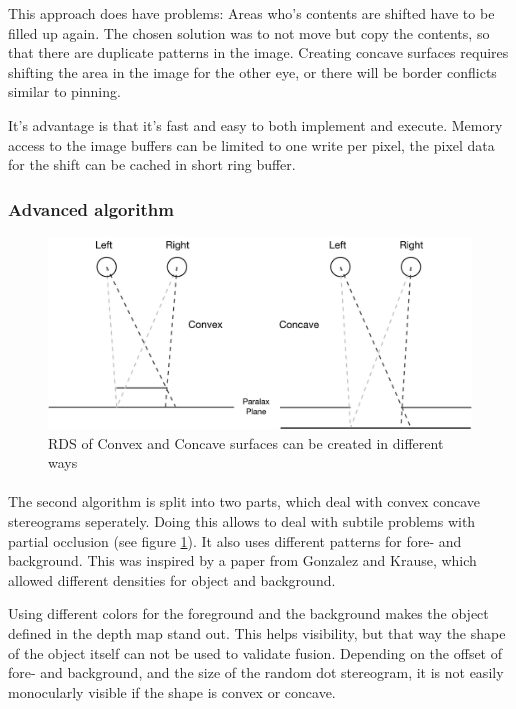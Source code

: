 This approach does have problems: Areas who's contents are shifted have to be filled up again. The chosen solution was to not move but copy the contents, so that there are duplicate patterns in the image. Creating concave surfaces requires shifting the area in the image for the other eye, or there will be border conflicts similar to pinning.

It's advantage is that it's fast and easy to both implement and execute. Memory access to the image buffers can be limited to one write per pixel, the pixel data for the shift can be cached in short ring buffer.

\subsubsection{Advanced algorithm}
\begin{figure}[htb]
\begin{center}
\includegraphics[width=15.5cm]{media/rds.pdf}
\caption{RDS of Convex and Concave surfaces can be created in different ways\label{ccRDS}}
\end{center}
\end{figure}

\paragraph{}
The second algorithm is split into two parts, which deal with convex concave stereograms seperately. Doing this allows to deal with subtile problems with partial occlusion (see figure \ref{ccRDS}). It also uses different patterns for fore- and background. This was inspired by a paper from Gonzalez and Krause\cite{GenRDS}, which allowed different densities for object and background.

Using different colors for the foreground and the background makes the object defined in the depth map stand out. This helps visibility, but that way the shape of the object itself can not be used to validate fusion. Depending on the offset of fore- and background, and the size of the random dot stereogram, it is not easily monocularly visible if the shape is convex or concave.


